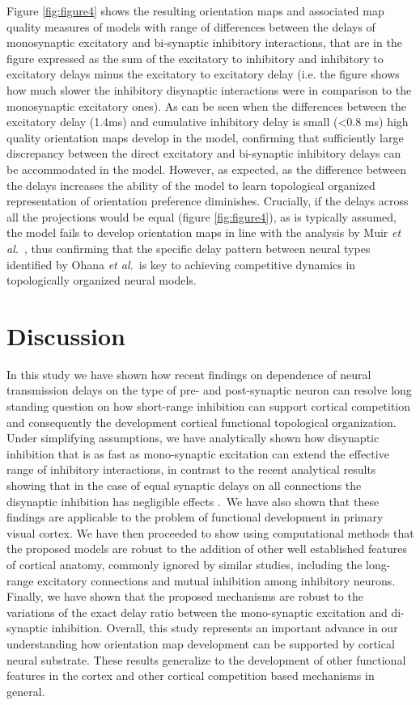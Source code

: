 \documentclass[utf8]{frontiersSCNS}
\newcommand{\etal}{\textit{et al.}}
\begin{document}
Figure \ref{fig:figure4} shows the resulting orientation maps and associated map quality measures of models with range of differences between the delays of monosynaptic excitatory and bi-synaptic inhibitory interactions, that are in the figure expressed as the sum of the excitatory to inhibitory and inhibitory to excitatory delays minus the excitatory to excitatory delay (i.e. the figure shows how much slower the inhibitory disynaptic interactions were in comparison to the monosynaptic excitatory ones). 
As can be seen when the differences between the excitatory delay (1.4ms) and cumulative inhibitory delay is small (\textless 0.8 ms) high quality orientation maps develop in the model, confirming that sufficiently 
large discrepancy between the direct excitatory and bi-synaptic inhibitory delays can be accommodated in the model. However, as expected, as the difference between the delays increases the ability of the model to learn topological organized representation of orientation preference diminishes. Crucially, if the delays across all the projections would be equal (figure \ref{fig:figure4}), as is typically assumed, the model fails to develop orientation maps in line with the analysis by Muir \etal \, \citep{Muir2014}, thus confirming that the specific delay pattern between neural types identified by Ohana \etal\,\citep{Ohana2012} is key to achieving competitive dynamics in topologically organized neural models.

\section{Discussion}

In this study we have shown how recent findings on dependence of neural transmission delays on the
type of pre- and post-synaptic neuron \citep{Ohana2012} can resolve long standing question on how short-range inhibition
can support cortical competition and consequently the development cortical functional topological organization.
Under simplifying assumptions, we have analytically shown how disynaptic inhibition that is as fast as mono-synaptic 
excitation can extend the effective range of inhibitory interactions, in contrast to the recent analytical 
results showing that in the case of equal synaptic delays on all connections the disynaptic inhibition has negligible effects \citep{Muir2014}.\
We have also shown that these findings are applicable to the problem of functional development in primary visual cortex. We have then proceeded 
to show using computational methods that the proposed models are robust to the addition of other well established features of cortical anatomy, commonly 
ignored by similar studies, including the long-range excitatory connections and mutual inhibition among inhibitory neurons. Finally, we have shown 
that the proposed mechanisms are robust to the variations of the exact delay ratio between the mono-synaptic excitation and di-synaptic inhibition. 
Overall, this study represents an important advance in our understanding how orientation map development can be supported by cortical neural substrate. These
results generalize to the development of other functional features in the cortex and other cortical competition based mechanisms in general.
\end{document}
